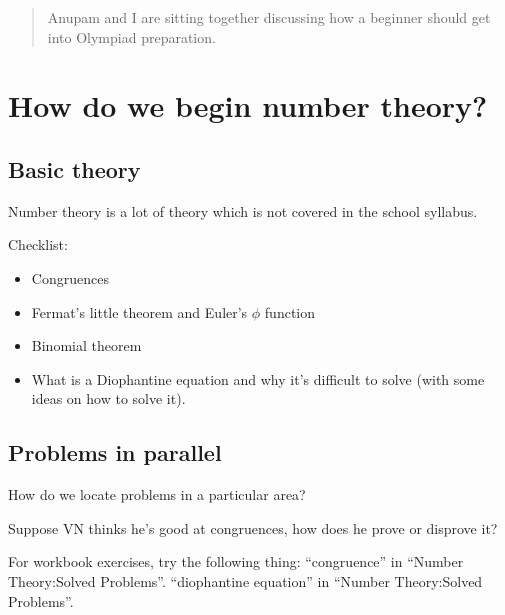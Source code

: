 \documentclass[a4paper]{amsart}
\title{}
\author{Vipul Naik}
\begin{document}
\maketitle

\begin{abstract}
  Anupam and I are sitting together discussing how a beginner should get into Olympiad preparation.
\end{abstract}

\section{How do we begin number theory?}

\subsection{Basic theory}

Number theory is a lot of theory which is not covered in the school syllabus.


Checklist:

\begin{itemize}

\item Congruences

\item Fermat's little theorem and Euler's $\phi$ function

\item Binomial theorem

\item What is a Diophantine equation and why it's difficult to solve (with some ideas on how to solve it).

\end{itemize}

\subsection{Problems in parallel}

How do we locate problems in a particular area?

Suppose VN thinks he's good at congruences, how does he prove or disprove it?

For workbook exercises, try the following thing: ``congruence'' in ``Number Theory:Solved Problems''.
``diophantine equation'' in ``Number Theory:Solved Problems''.

\end{document}
